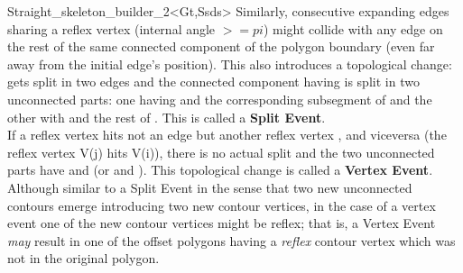 \begin{ccRefClass}{Straight_skeleton_builder_2<Gt,Ssds>}
Similarly, consecutive expanding edges  sharing a reflex vertex (internal angle $>=pi$) might collide with any edge  on the rest of the same connected component of the polygon boundary (even far away from the initial edge's position). This also introduces a topological change:  gets split in two edges and the connected component having  is split in two unconnected parts: one having  and the corresponding subsegment of  and the other with  and the rest of . This is called a \textbf{Split Event}.\\ If a reflex vertex hits not an edge  but another reflex vertex , and viceversa (the reflex vertex V(j) hits V(i)), there is no actual split and the two unconnected parts have  and  (or  and ). This topological change is called a \textbf{Vertex Event}. Although similar to a Split Event in the sense that two new unconnected contours emerge introducing two new contour vertices, in the case of a vertex event one of the new contour vertices might be reflex; that is, a Vertex Event \textit{may} result in one of the offset polygons having a \textit{reflex} contour vertex which was not in the original polygon.


\end{ccRefClass}
